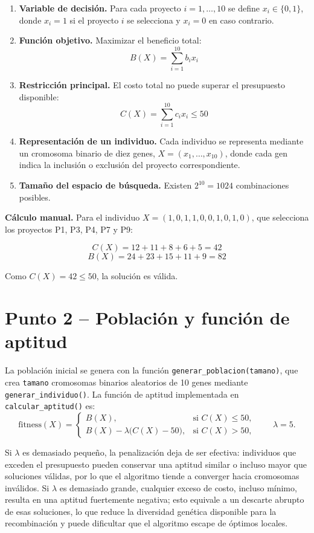 \documentclass[12pt,a4paper]{article}
\begin{document}
\begin{enumerate}
\item[a)] \textbf{Variable de decisi\'{o}n.} Para cada proyecto
$i = 1, \dots, 10$ se define $x_i \in \{0,1\}$, donde $x_i = 1$ si el
proyecto $i$ se selecciona y $x_i = 0$ en caso contrario.

\item[b)] \textbf{Funci\'{o}n objetivo.} Maximizar el beneficio total:
\[
B(X) = \sum_{i=1}^{10} b_i x_i
\]

\item[c)] \textbf{Restricci\'{o}n principal.} El costo total no puede
superar el presupuesto disponible:
\[
C(X) = \sum_{i=1}^{10} c_i x_i \leq 50
\]

\item[d)] \textbf{Representaci\'{o}n de un individuo.} Cada individuo se
representa mediante un cromosoma binario de diez genes,
$X = (x_1, \dots, x_{10})$, donde cada gen indica la inclusi\'{o}n o
exclusi\'{o}n del proyecto correspondiente.

\item[e)] \textbf{Tama\~{n}o del espacio de b\'{u}squeda.} Existen
$2^{10} = 1024$ combinaciones posibles.
\end{enumerate}

\textbf{C\'{a}lculo manual.} Para el individuo
$X = (1, 0, 1, 1, 0, 0, 1, 0, 1, 0)$, que selecciona los proyectos
P1, P3, P4, P7 y P9:

\[
C(X) = 12 + 11 + 8 + 6 + 5 = 42
\]
\[
B(X) = 24 + 23 + 15 + 11 + 9 = 82
\]

Como $C(X) = 42 \leq 50$, la soluci\'{o}n es v\'{a}lida.

\section{Punto 2 -- Poblaci\'{o}n y funci\'{o}n de aptitud}

La poblaci\'{o}n inicial se genera con la funci\'{o}n
\texttt{generar\_poblacion(tamano)}, que crea \texttt{tamano}
cromosomas binarios aleatorios de 10 genes mediante
\texttt{generar\_individuo()}. La funci\'{o}n de aptitud implementada
en \texttt{calcular\_aptitud()} es:
\[
\text{fitness}(X) =
\begin{cases}
B(X), & \text{si } C(X) \leq 50, \\[2pt]
B(X) - \lambda\big(C(X) - 50\big), & \text{si } C(X) > 50,
\end{cases}
\qquad \lambda = 5.
\]

Si $\lambda$ es demasiado peque\~{n}o, la penalizaci\'{o}n deja de ser
efectiva: individuos que exceden el presupuesto pueden conservar una
aptitud similar o incluso mayor que soluciones v\'{a}lidas, por lo que
el algoritmo tiende a converger hacia cromosomas inv\'{a}lidos. Si
$\lambda$ es demasiado grande, cualquier exceso de costo, incluso
m\'{i}nimo, resulta en una aptitud fuertemente negativa; esto equivale
a un descarte abrupto de esas soluciones, lo que reduce la
diversidad gen\'{e}tica disponible para la recombinaci\'{o}n y puede
dificultar que el algoritmo escape de \'{o}ptimos locales.
\end{document}
